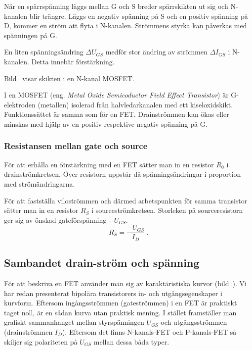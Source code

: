 När en spärrspänning läggs mellan G och S breder spärrskikten ut sig och
N-kanalen blir trängre.
Läggs en negativ spänning på S och en positiv spänning på D, kommer en ström att
flyta i N-kanalen.
Strömmens styrka kan påverkas med spänningen på G.

En liten spänningsändring \(\Delta U_{GS}\) medför stor ändring av strömmen
\(\Delta I_{GS}\) i N-kanalen. Detta innebär förstärkning.



\newpage
Bild~ visar skikten i en N-kanal MOSFET.

I en MOSFET (eng. \emph{Metal Oxide Semicoductor Field Effect Transistor}) är
G-elektroden (metallen) isolerad från halvledarkanalen med ett kiseloxidskikt.
Funktionssättet är samma som för en FET.
Drainströmmen kan ökas eller minskas med hjälp av en positiv respektive negativ
spänning på G.

\subsubsection{Resistansen mellan gate och source}

För att erhålla en förstärkning med en FET sätter man in en resistor \(R_0\) i
drainströmkretsen.
Över resistorn uppstår då spänningsändringar i proportion med strömändringarna.

För att fastställa viloströmmen och därmed arbetspunkten för samma transistor
sätter man in en resistor \(R_S\) i sourceströmkretsen.
Storleken på sourceresistorn ger sig av önskad gateförspänning \(-U_{GS}\).
\[R_S = \dfrac{-U_{GS}}{I_D}~.\]


\newpage
\subsection{Sambandet drain-ström och spänning}

För att beskriva en FET använder man sig av karaktäristiska kurvor
(bild~).
Vi har redan presenterat bipolära transistorers in- och utgångsegenskaper i kurvform.
Eftersom ingångsströmmen (gateströmmen) i en FET är praktiskt taget noll, är en
sådan kurva utan praktisk mening.
I stället framställer man grafiskt sammanhanget mellan styrspänningen \(U_{GS}\)
och utgångsströmmen (drainströmmen \(I_D\)).
Eftersom det finns N-kanals-FET och P-kanals-FET så skiljer sig polariteten på
\(U_{GS}\) mellan dessa båda typer.
